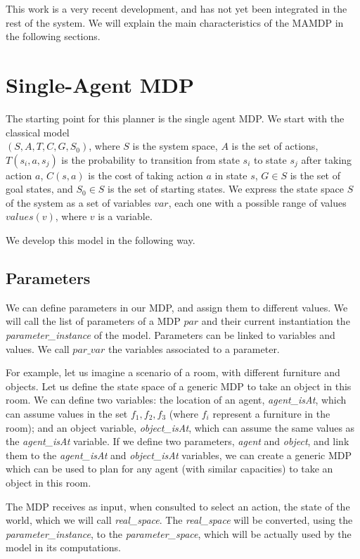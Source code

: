 This work is a very recent development, and has not yet been integrated in the rest of the system. We will explain the main characteristics of the MAMDP in the following sections.


\section{Single-Agent MDP}
\label{sec:mamdp-single_agent}
The starting point for this planner is the single agent MDP. We start with the classical model \\ $(S,A,T,C,G,S_0)$, where $S$ is the system space, $A$ is the set of actions, $T(s_i,a,s_j)$ is the probability to transition from state $s_i$ to state $s_j$ after taking action $a$, $C(s,a)$ is the cost of taking action $a$ in state $s$, $G \in S$ is the set of goal states, and $S_0 \in S$ is the set of starting states. We express the state space $S$ of the system as a set of variables $var$, each one with a possible range of values $values(v)$, where $v$ is a variable.

 We develop this model in the following way.

\subsection{Parameters}
We can define parameters in our MDP, and assign them to different values. We will call the list of parameters of a MDP $par$ and their current instantiation the \textit{parameter\_instance} of the model. Parameters can be linked to variables and values. We call $par\_var$ the variables associated to a parameter. 

For example, let us imagine a scenario of a room, with different furniture and objects. Let us define the state space of a generic MDP to take an object in this room. We can define two variables: the location of an agent, \textit{agent\_isAt}, which can assume values in the set ${f_1, f_2, f_3}$ (where $f_i$ represent a furniture in the room); and an object variable, \textit{object\_isAt}, which can assume the same values as the \textit{agent\_isAt} variable. If we define two parameters, \textit{agent} and \textit{object}, and link them to the \textit{agent\_isAt} and \textit{object\_isAt} variables, we can create a generic MDP which can be used to plan for any agent (with similar capacities) to take an object in this room.

The MDP receives as input, when consulted to select an action, the state of the world,  which we will call \textit{real\_space}. The \textit{real\_space} will be converted, using the \textit{parameter\_instance}, to the \textit{parameter\_space}, which will be actually used by the model in its computations. 

